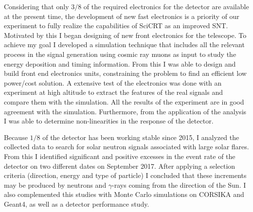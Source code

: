 Considering that only $3/8$ of the required electronics for the detector are available at the present time, the development of new fast electronics is a priority of our experiment to fully realize the capabilities of SciCRT as an improved SNT. Motivated by this I began designing of new front electronics for the telescope. To achieve my goal I developed a simulation technique that includes all the relevant process in the signal generation using cosmic ray muons as input to study the energy deposition and timing information. From this I was able to design and build front end electronics units, constraining the problem to find an efficient low power/cost solution. A extensive test of the electronics was done with an experiment at high altitude to extract the features of the real signals and compare them with the simulation. All the results of the experiment are in good agreement with the simulation. Furthermore, from the application of the analysis I was able to determine non-linearities in the response of the detector.

Because $1/8$ of the detector has been working stable since \num{2015}, I analyzed the collected data to search for solar neutron signals associated with large solar flares. From this I identified significant and positive excesses in the event rate of the detector on two different dates on September \num{2017}. After applying a selection criteria (direction, energy and type of particle) I concluded that these increments may be produced by neutrons and $\gamma$-rays coming from the direction of the Sun. I also complemented this studies with Monte Carlo simulations on CORSIKA and Geant4, as well as a detector performance study.
